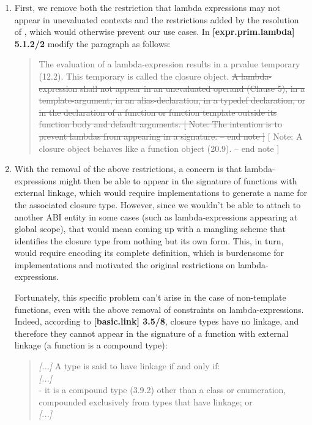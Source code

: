 \documentclass[11pt]{article}
\newcommand{\deleted}[1]{\st{#1}}
\begin{document}
\begin{enumerate}
  \item First, we remove both the restriction that lambda expressions may not
  appear in unevaluated contexts and the restrictions added by the resolution
  of \cite{DR1607}, which would otherwise prevent our use cases.
  In \textbf{[expr.prim.lambda] 5.1.2/2} modify the paragraph as follows:
  \begin{quote}
    The evaluation of a lambda-expression results in a prvalue temporary
    (12.2). This temporary is called the closure object. \deleted{A
    lambda-expression shall not appear in an unevaluated operand (Clause 5),
    in a template-argument, in an alias-declaration, in a typedef declaration,
    or in the declaration of a function or function template outside its function
    body and default arguments. [ Note: The intention is to prevent lambdas from
    appearing in a signature. -- end note ]} [ Note: A closure object behaves like
    a function object (20.9). -- end note ]
  \end{quote}


  \item With the removal of the above restrictions, a concern is that lambda-
  expressions might then be able to appear in the signature of functions with
  external linkage, which would require implementations to generate a name for
  the associated closure type. However, since we wouldn't be able to attach to
  another ABI entity in some cases (such as lambda-expressions appearing at
  global scope), that would mean coming up with a mangling scheme that identifies
  the closure type from nothing but its own form. This, in turn, would require
  encoding its complete definition, which is burdensome for implementations
  and motivated the original restrictions on lambda-expressions.

  Fortunately, this specific problem can't arise in the case of non-template
  functions, even with the above removal of constraints on lambda-expressions.
  Indeed, according to \textbf{[basic.link] 3.5/8}, closure types have no linkage,
  and therefore they cannot appear in the signature of a function with external
  linkage (a function is a compound type):
  \begin{quote}
    \textit{[...]} A type is said to have linkage if and only if:\\
    \textit{[...]}\\
    - it is a compound type (3.9.2) other than a class or enumeration,
      compounded exclusively from types that have linkage; or \\
    \textit{[...]}
  \end{quote}


\end{enumerate}
\end{document}

